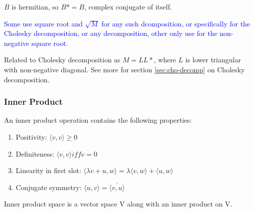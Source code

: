 $B$ is hermitian, so $B* = B$, complex conjugate of itself. 

\textcolor{blue}{Some use square root and $\sqrt{M}$ for any such dcomposition,
or specifically for the Cholesky decomposition, or any decomposition, other
only use for the non-negative square root.}

Related to Cholesky decomposition as $M = LL*$, where $L$ is lower
triangular with non-negative diagonal. See more for section
\ref{sec:cho-decomp} on Cholesky decomposition.

\subsubsection{Inner Product}
An inner product operation contains the following properties:
\begin{enumerate}[itemsep=0pt]
    \item Positivity: $\langle v, v \rangle \geq 0$
    \item Definiteness: $\langle v, v \rangle iff v = 0$
    \item Linearity in first slot: $\langle \lambda v + u, w \rangle = \lambda \langle v, w \rangle + \langle u, w \rangle$
    \item Conjugate symmetry: $\langle u ,v \rangle = \overline{\langle v, u \rangle}$
\end{enumerate}
Inner product space is a vector space V along with an inner product on V.
